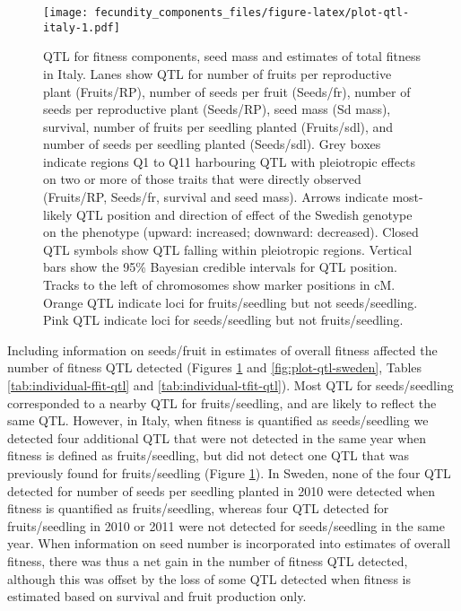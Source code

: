 \documentclass[]{article}
\begin{document}
\begin{figure}
\centering
\texttt{[image: fecundity\_components\_files/figure-latex/plot-qtl-italy-1.pdf]}
\caption{\label{fig:plot-qtl-italy}QTL for fitness components, seed mass and estimates of total fitness in Italy. Lanes show QTL for number of fruits per reproductive plant (Fruits/RP), number of seeds per fruit (Seeds/fr), number of seeds per reproductive plant (Seeds/RP), seed mass (Sd mass), survival, number of fruits per seedling planted (Fruits/sdl), and number of seeds per seedling planted (Seeds/sdl). Grey boxes indicate regions Q1 to Q11 harbouring QTL with pleiotropic effects on two or more of those traits that were directly observed (Fruits/RP, Seeds/fr, survival and seed mass). Arrows indicate most-likely QTL position and direction of effect of the Swedish genotype on the phenotype (upward: increased; downward: decreased). Closed QTL symbols show QTL falling within pleiotropic regions. Vertical bars show the 95\% Bayesian credible intervals for QTL position. Tracks to the left of chromosomes show marker positions in cM. Orange QTL indicate loci for fruits/seedling but not seeds/seedling. Pink QTL indicate loci for seeds/seedling but not fruits/seedling.}
\end{figure}

Including information on seeds/fruit in estimates of overall fitness affected the number of fitness QTL detected (Figures \ref{fig:plot-qtl-italy} and \ref{fig:plot-qtl-sweden}, Tables \ref{tab:individual-ffit-qtl} and \ref{tab:individual-tfit-qtl}). Most QTL for seeds/seedling corresponded to a nearby QTL for fruits/seedling, and are likely to reflect the same QTL. However, in Italy, when fitness is quantified as seeds/seedling we detected four additional QTL that were not detected in the same year when fitness is defined as fruits/seedling, but did not detect one QTL that was previously found for fruits/seedling (Figure \ref{fig:plot-qtl-italy}). In Sweden, none of the four QTL detected for number of seeds per seedling planted in 2010 were detected when fitness is quantified as fruits/seedling, whereas four QTL detected for fruits/seedling in 2010 or 2011 were not detected for seeds/seedling in the same year. When information on seed number is incorporated into estimates of overall fitness, there was thus a net gain in the number of fitness QTL detected, although this was offset by the loss of some QTL detected when fitness is estimated based on survival and fruit production only.
\end{document}
